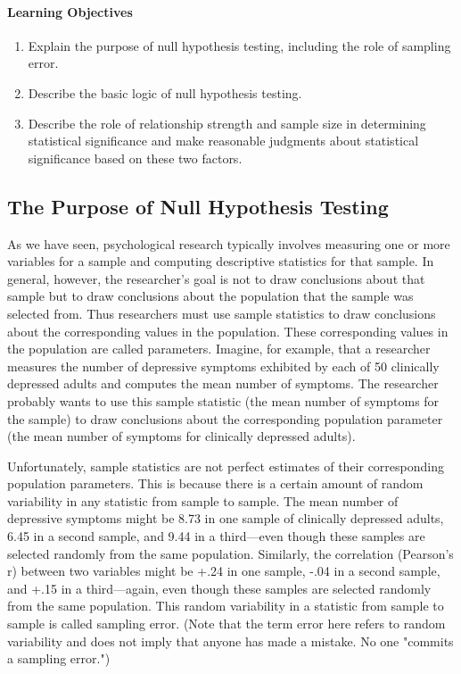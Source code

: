 \paragraph{Learning Objectives}
    \begin{enumerate}
    \item   Explain the purpose of null hypothesis testing, including the role of sampling error.

    \item Describe the basic logic of null hypothesis testing.

    \item Describe the role of relationship strength and sample size in determining statistical significance and make reasonable judgments about statistical significance based on these two factors.

      \end{enumerate}


\subsection{The Purpose of Null Hypothesis Testing}

As we have seen, psychological research typically involves measuring one or more variables for a sample and computing descriptive statistics for that sample. In general, however, the researcher's goal is not to draw conclusions about that sample but to draw conclusions about the population that the sample was selected from. Thus researchers must use sample statistics to draw conclusions about the corresponding values in the population. These corresponding values in the population are called parameters. Imagine, for example, that a researcher measures the number of depressive symptoms exhibited by each of 50 clinically depressed adults and computes the mean number of symptoms. The researcher probably wants to use this sample statistic (the mean number of symptoms for the sample) to draw conclusions about the corresponding population parameter (the mean number of symptoms for clinically depressed adults).


Unfortunately, sample statistics are not perfect estimates of their corresponding population parameters. This is because there is a certain amount of random variability in any statistic from sample to sample. The mean number of depressive symptoms might be 8.73 in one sample of clinically depressed adults, 6.45 in a second sample, and 9.44 in a third---even though these samples are selected randomly from the same population. Similarly, the correlation (Pearson's r) between two variables might be +.24 in one sample, -.04 in a second sample, and +.15 in a third---again, even though these samples are selected randomly from the same population. This random variability in a statistic from sample to sample is called sampling error. (Note that the term error here refers to random variability and does not imply that anyone has made a mistake. No one "commits a sampling error.")


